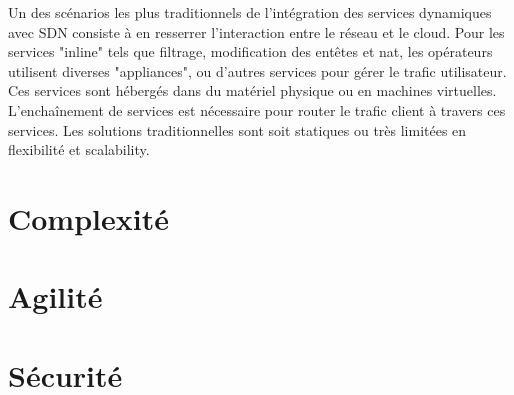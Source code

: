 Un des scénarios les plus traditionnels de l'intégration des services dynamiques avec SDN consiste à en resserrer l'interaction entre le réseau et le cloud. Pour les services "inline" tels que filtrage, modification des entêtes et \gls{nat}, les opérateurs utilisent diverses "appliances", ou d'autres services pour gérer le trafic utilisateur. Ces services sont hébergés dans du matériel physique ou en machines virtuelles. L’enchaînement de services est nécessaire pour router le trafic client à travers ces services. Les solutions traditionnelles sont soit statiques ou très limitées en flexibilité et \gls{scalability}.






\section{Complexité}

\section{Agilité}

\section{Sécurité}
